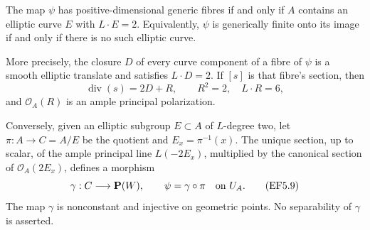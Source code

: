 \begin{proposition}
\label{prop:DE-five-evaluation-fibre-dichotomy}
The map \(\psi\) has positive-dimensional generic fibres if
and only if \(A\) contains an elliptic curve \(E\) with
\(L\cdot E=2\). Equivalently, \(\psi\) is generically finite
onto its image if and only if there is no such elliptic curve.

More precisely, the closure \(D\) of every curve component of
a fibre of \(\psi\) is a smooth elliptic translate and satisfies
\(L\cdot D=2\). If \([s]\) is that fibre's section, then
\[
               \operatorname{div}(s)=2D+R,
        \qquad R^2=2,\quad L\cdot R=6,
 \tag{EF5.8}
\]
and \(\mathcal O_A(R)\) is an ample principal polarization.

Conversely, given an elliptic subgroup \(E\subset A\) of
\(L\)-degree two, let \(\pi:A\to C=A/E\) be the quotient
and \(E_x=\pi^{-1}(x)\). The unique section, up to scalar, of
the ample principal line \(L(-2E_x)\), multiplied by the
canonical section of \(\mathcal O_A(2E_x)\), defines a
morphism
\[
          \gamma:C\longrightarrow\mathbf P(W),
        \qquad \psi=\gamma\circ\pi\quad\hbox{on }U_A.
 \tag{EF5.9}
\]
The map \(\gamma\) is nonconstant and injective on geometric
points. No separability of \(\gamma\) is asserted.
\end{proposition}
